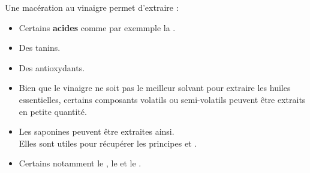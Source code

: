 \begin{Remarque}

    Une macération au vinaigre permet d'extraire :
	\begin{multicols}{2}
        \begin{itemize}[label = \faPen]
		\item Certains \textbf{acides} comme par exemmple la .
		\item Des tanins.
		\item Des antioxydants.
		\item Bien que le vinaigre ne soit pas le meilleur solvant pour extraire les huiles essentielles, certains composants volatils ou semi-volatils peuvent être extraits en petite quantité.
		\item Les saponines peuvent être extraites ainsi.\\ Elles sont utiles pour récupérer les principes  et .
		\item Certains  notamment le , le  et le .
        \end{itemize}
    \end{multicols}
\end{Remarque}